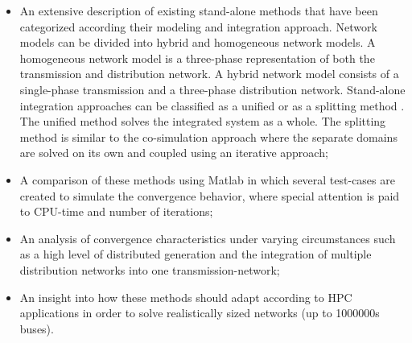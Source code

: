 \documentclass[10pt,journal]{article}
\begin{document}
\begin{itemize}
    \item An extensive description of existing stand-alone methods that have been categorized according their modeling and integration approach. Network models can be divided into hybrid and homogeneous network models. A homogeneous network model is a three-phase representation of both the transmission and distribution network. A hybrid network model consists of a single-phase transmission and a three-phase distribution network. Stand-alone integration approaches can be classified as a unified \cite{Taranto2008} or as a splitting method \cite{Sun2005}. The unified method  solves the integrated system as a whole. The splitting method is similar to the co-simulation approach where the separate domains are solved on its own and coupled using an iterative approach;
    \item A comparison of these methods using Matlab  in which several test-cases are created to simulate the convergence behavior, where special attention is paid to CPU-time and number of iterations;
    \item An analysis of convergence characteristics under varying circumstances such as a high level of distributed generation and the integration of multiple distribution networks into one transmission-network;
    \item An insight into how these methods should adapt according to HPC applications in order to solve realistically sized networks (up to 1000000s buses). 
\end{itemize}


\end{document}
